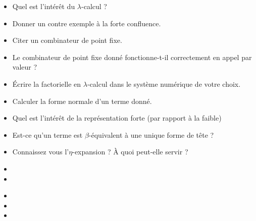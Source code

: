 \documentclass{agregfiche}
\begin{document}
\secquestionsclassiques

\begin{itemize}
    \item Quel est l'intérêt du $\lambda$-calcul ?
    \item Donner un contre exemple à la forte confluence.
    \item Citer un combinateur de point fixe.
    \item Le combinateur de point fixe donné 
        fonctionne-t-il correctement en appel 
        par valeur ?
    \item Écrire la factorielle en $\lambda$-calcul 
        dans le système numérique de votre choix.
    \item Calculer la forme normale d'un terme donné.
    \item Quel est l'intérêt de la représentation forte (par rapport à la faible)
    \item Est-ce qu'un terme est $\beta$-équivalent à une unique forme de tête ?
    \item Connaissez vous l'$\eta$-expansion ? À quoi peut-elle servir ?
\end{itemize}

\secreferences

\begin{itemize}
    \item {}
    \item {}
\end{itemize}


\secdev

\begin{itemize}
    \item {}
    \item {}
    \item {}
\end{itemize}
\end{document}

